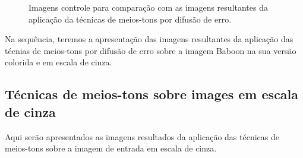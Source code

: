\documentclass{article}
\begin{document}
\begin{figure}[htp]%
	\centering
	
	\qquad
	
	\caption{Imagens controle para comparação com as imagens resultantes da aplicação da técnicas de meios-tons por difusão de erro.}%
	
	\label{fig:imagem:controle}%
\end{figure}

Na sequência, teremos a apresentação das imagens resultantes da aplicação das técnias de meios-tons por difusão de erro sobre a imagem Baboon na sua versão colorida e em escala de cinza.



\subsection{Técnicas de meios-tons sobre images em escala de cinza}
Aqui serão apresentados as imagens resultados da aplicação das técnicas de meios-tons sobre a imagem de entrada em escala de cinza.
\end{document}
